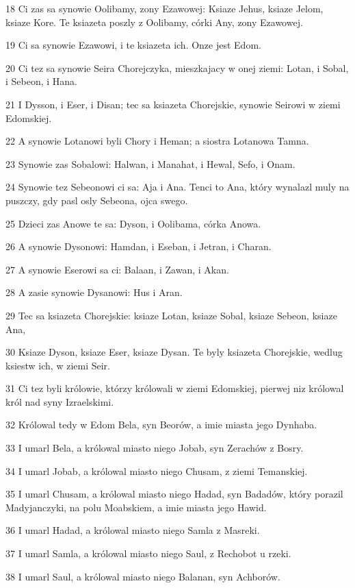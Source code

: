 \par 18 Ci zas sa synowie Oolibamy, zony Ezawowej: Ksiaze Jehus, ksiaze Jelom, ksiaze Kore. Te ksiazeta poszly z Oolibamy, córki Any, zony Ezawowej.
\par 19 Ci sa synowie Ezawowi, i te ksiazeta ich. Onze jest Edom.
\par 20 Ci tez sa synowie Seira Chorejczyka, mieszkajacy w onej ziemi: Lotan, i Sobal, i Sebeon, i Hana.
\par 21 I Dysson, i Eser, i Disan; tec sa ksiazeta Chorejskie, synowie Seirowi w ziemi Edomskiej.
\par 22 A synowie Lotanowi byli Chory i Heman; a siostra Lotanowa Tamna.
\par 23 Synowie zas Sobalowi: Halwan, i Manahat, i Hewal, Sefo, i Onam.
\par 24 Synowie tez Sebeonowi ci sa: Aja i Ana. Tenci to Ana, który wynalazl muly na puszczy, gdy pasl osly Sebeona, ojca swego.
\par 25 Dzieci zas Anowe te sa: Dyson, i Oolibama, córka Anowa.
\par 26 A synowie Dysonowi: Hamdan, i Eseban, i Jetran, i Charan.
\par 27 A synowie Eserowi sa ci: Balaan, i Zawan, i Akan.
\par 28 A zasie synowie Dysanowi: Hus i Aran.
\par 29 Tec sa ksiazeta Chorejskie: ksiaze Lotan, ksiaze Sobal, ksiaze Sebeon, ksiaze Ana,
\par 30 Ksiaze Dyson, ksiaze Eser, ksiaze Dysan. Te byly ksiazeta Chorejskie, wedlug ksiestw ich, w ziemi Seir.
\par 31 Ci tez byli królowie, którzy królowali w ziemi Edomskiej, pierwej niz królowal król nad syny Izraelskimi.
\par 32 Królowal tedy w Edom Bela, syn Beorów, a imie miasta jego Dynhaba.
\par 33 I umarl Bela, a królowal miasto niego Jobab, syn Zerachów z Bosry.
\par 34 I umarl Jobab, a królowal miasto niego Chusam, z ziemi Temanskiej.
\par 35 I umarl Chusam, a królowal miasto niego Hadad, syn Badadów, który porazil Madyjanczyki, na polu Moabskiem, a imie miasta jego Hawid.
\par 36 I umarl Hadad, a królowal miasto niego Samla z Masreki.
\par 37 I umarl Samla, a królowal miasto niego Saul, z Rechobot u rzeki.
\par 38 I umarl Saul, a królowal miasto niego Balanan, syn Achborów.
